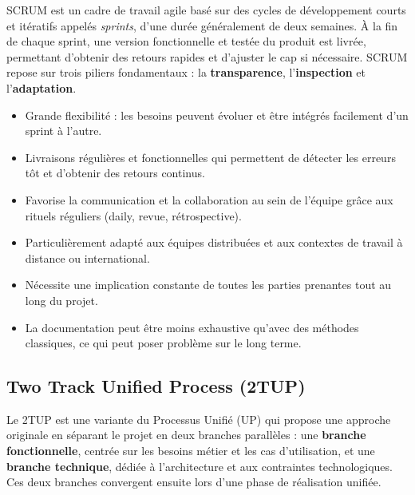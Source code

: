 \documentclass[12pt,a4paper]{report}
\begin{document}
	SCRUM est un cadre de travail agile basé sur des cycles de développement courts 
	et itératifs appelés \textit{sprints}, d'une durée généralement de deux semaines. 
	À la fin de chaque sprint, une version fonctionnelle et testée du produit est livrée, 
	permettant d'obtenir des retours rapides et d'ajuster le cap si nécessaire. SCRUM 
	repose sur trois piliers fondamentaux : la \textbf{transparence}, l'\textbf{inspection} 
	et l'\textbf{adaptation}.
	
	\begin{itemize}
		\item[\textcolor{green}{\textbf{+}}] Grande flexibilité : les besoins peuvent 
		évoluer et être intégrés facilement d'un sprint à l'autre.
		\item[\textcolor{green}{\textbf{+}}] Livraisons régulières et fonctionnelles 
		qui permettent de détecter les erreurs tôt et d'obtenir des retours continus.
		\item[\textcolor{green}{\textbf{+}}] Favorise la communication et la collaboration 
		au sein de l'équipe grâce aux rituels réguliers (daily, revue, rétrospective).
		\item[\textcolor{green}{\textbf{+}}] Particulièrement adapté aux équipes 
		distribuées et aux contextes de travail à distance ou international.
		\item[\textcolor{red}{\textbf{--}}] Nécessite une implication constante de toutes 
		les parties prenantes tout au long du projet.
		\item[\textcolor{red}{\textbf{--}}] La documentation peut être moins exhaustive 
		qu'avec des méthodes classiques, ce qui peut poser problème sur le long terme.
	\end{itemize}
	
	\subsection{Two Track Unified Process (2TUP)}
	
	Le 2TUP est une variante du Processus Unifié (UP) qui propose une approche originale 
	en séparant le projet en deux branches parallèles : une \textbf{branche fonctionnelle}, 
	centrée sur les besoins métier et les cas d'utilisation, et une \textbf{branche 
		technique}, dédiée à l'architecture et aux contraintes technologiques. Ces deux 
	branches convergent ensuite lors d'une phase de réalisation unifiée.
	
\end{document}
